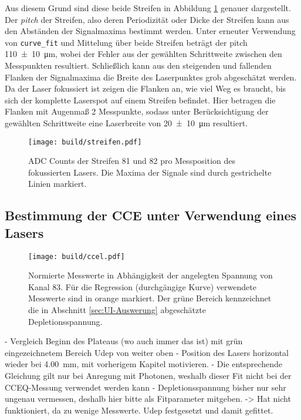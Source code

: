 Aus diesem Grund sind diese beide Streifen in Abbildung \ref{fig:streifen}
genauer dargestellt. Der \emph{pitch} der Streifen, also deren Periodizität oder
Dicke der Streifen kann aus den Abständen der Signalmaxima bestimmt werden.
Unter erneuter Verwendung von \texttt{curve\_fit} und Mittelung über beide Streifen
beträgt der pitch \SI{110(10)}{\micro\meter}, wobei der Fehler aus der gewählten
Schrittweite zwischen den Messpunkten resultiert.
Schließlich kann aus den steigenden und fallenden Flanken der Signalmaxima die
Breite des Laserpunktes grob abgeschätzt werden.
Da der Laser fokussiert ist zeigen die Flanken an, wie viel Weg es braucht, bis
sich der komplette Laserspot auf einem Streifen befindet.
Hier betragen die Flanken mit Augenmaß 2 Messpunkte, sodass unter Berücksichtigung
der gewählten Schrittweite eine Laserbreite von \SI{20(10)}{\micro\meter} resultiert.
\begin{figure}
  \centering
  \texttt{[image: build/streifen.pdf]}  %
  \caption{ADC Counts der Streifen 81 und 82 pro Messposition des fokussierten
  Lasers. Die Maxima der Signale sind durch gestrichelte Linien markiert.}
  \label{fig:streifen}
\end{figure}

\FloatBarrier
\subsection{Bestimmung der CCE unter Verwendung eines Lasers}
\label{sec:CCEL-Auswertung}

\begin{figure}
  \centering
  \texttt{[image: build/ccel.pdf]}  %
  \caption{Normierte Messwerte in Abhängigkeit der angelegten Spannung von Kanal
  83. Für die Regression (durchgängige Kurve) verwendete Messwerte sind in orange markiert.
  Der grüne Bereich kennzeichnet die in Abschnitt \ref{sec:UI-Auswerung} abgeschätzte
  Depletionsspannung.}
  \label{fig:ccel}
\end{figure}
- Vergleich Beginn des Plateaus (wo auch immer das ist) mit grün eingezeichnetem
Bereich Udep von weiter oben
- Position des Lasers horizontal wieder bei \SI{4.00}{\milli\meter}, mit vorherigem
Kapitel motivieren.
- Die entsprechende Gleichung gilt nur bei Anregung mit Photonen, weshalb dieser Fit
nicht bei der CCEQ-Messung verwendet werden kann
- Depletionsspannung bisher nur sehr ungenau vermessen, deshalb hier bitte als
Fitparameter mitgeben.
-> Hat nicht funktioniert, da zu wenige Messwerte. Udep festgesetzt und damit gefittet.

